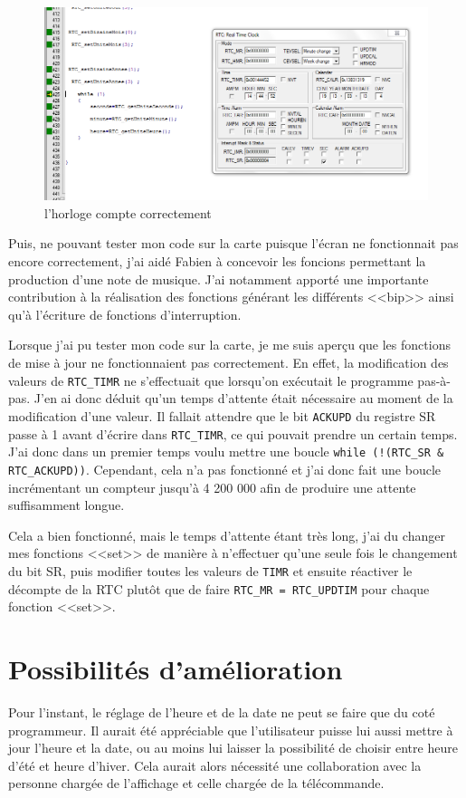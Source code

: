 \documentclass[a4paper]{report}
\begin{document}
\begin{figure}[h!]
	\centering
	\includegraphics[scale=0.4]{images/RTC_fig2.png}
	\caption{l'horloge compte correctement}
	\label{RTC-image2}
\end{figure}

Puis, ne pouvant tester mon code sur la carte puisque l'écran ne fonctionnait pas encore correctement, j'ai aidé Fabien à concevoir les foncions permettant la production d'une note de musique.
J'ai notamment apporté une importante contribution à la réalisation des fonctions générant les différents <<bip>> ainsi qu'à l'écriture de fonctions d'interruption.

Lorsque j'ai pu tester mon code sur la carte, je me suis aperçu que les fonctions de mise à jour ne fonctionnaient pas correctement. En effet, la modification des valeurs de \texttt{RTC\_TIMR} ne s'effectuait que lorsqu'on exécutait le programme pas-à-pas.
J'en ai donc déduit qu'un temps d'attente était nécessaire au moment de la modification d'une valeur.
Il fallait attendre que le bit \texttt{ACKUPD} du registre SR passe à 1 avant d'écrire dans \texttt{RTC\_TIMR}, ce qui pouvait prendre un certain temps.
J'ai donc dans un premier temps voulu mettre une boucle \texttt{while (!(RTC\_SR \& RTC\_ACKUPD))}.
Cependant, cela n'a pas fonctionné et j'ai donc fait une boucle incrémentant un compteur jusqu'à 4 200 000 afin de produire une attente suffisamment longue.

Cela a bien fonctionné, mais le temps d'attente étant très long, j'ai du changer mes fonctions <<set>> de manière à n'effectuer qu'une seule fois le changement du bit SR, puis modifier toutes les valeurs de \texttt{TIMR} et ensuite réactiver le décompte de la RTC plutôt que de faire \texttt{RTC\_MR = RTC\_UPDTIM} pour chaque fonction <<set>>.

\section{Possibilités d'amélioration}
Pour l'instant, le réglage de l'heure et de la date ne peut se faire que du coté programmeur.
Il aurait été appréciable que l'utilisateur puisse lui aussi mettre à jour l'heure et la date, ou au moins lui laisser la possibilité de choisir entre heure d'été et heure d'hiver.
Cela aurait alors nécessité une collaboration avec la personne chargée de l'affichage et celle chargée de la télécommande.
\end{document}
